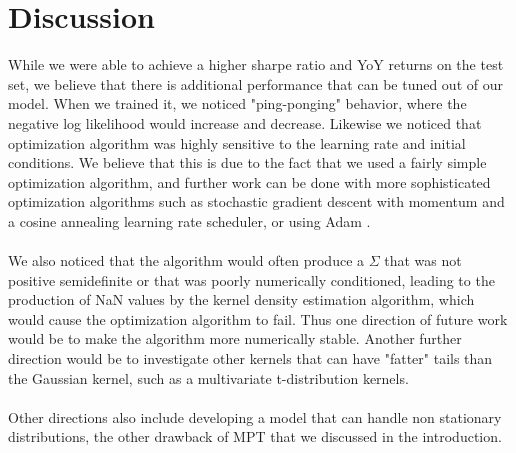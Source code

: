\documentclass[10pt]{article}
\begin{document}
\section{Discussion}
While we were able to achieve a higher sharpe ratio and YoY returns on the test set, we believe that there is additional 
performance that can be tuned out of our model. When we trained it, we noticed "ping-ponging" behavior, where the 
negative log likelihood would increase and decrease. Likewise we noticed that optimization algorithm was highly 
sensitive to the learning rate and initial conditions. We believe that this is due to the fact that we used a fairly 
simple optimization algorithm, and further work can be done with more sophisticated optimization algorithms such as stochastic
gradient descent with momentum and a cosine annealing learning rate scheduler, or using Adam \cite{kingma2014adam}.\\\\
We also noticed that the algorithm would often produce a $\Sigma$ that was not positive semidefinite or that was 
poorly numerically conditioned, leading to the production of NaN values by the kernel density estimation algorithm, which would 
cause the optimization algorithm to fail. Thus one direction of future work would be to make the algorithm more numerically stable.
Another further direction would be to investigate other kernels that can have "fatter" tails than the Gaussian kernel,
such as a multivariate t-distribution kernels.\\\\
Other directions also include developing a model that can handle non stationary distributions, the other drawback of 
MPT that we discussed in the introduction.


\end{document}
